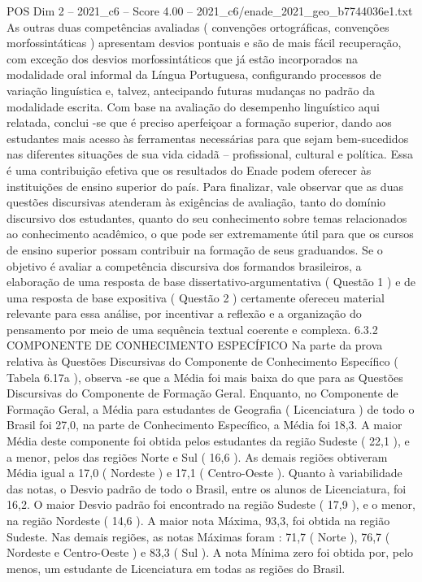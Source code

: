 \begin{textsample}{POS Dim 2 – 2021\_c6 – Score 4.00 – 2021\_c6/enade\_2021\_geo\_b7744036e1.txt}
As outras duas competências avaliadas ( convenções ortográficas, convenções morfossintáticas ) apresentam desvios pontuais e são de mais fácil recuperação, com exceção dos desvios morfossintáticos que já estão incorporados na modalidade oral informal da Língua Portuguesa, configurando processos de variação linguística e, talvez, antecipando futuras mudanças no padrão da modalidade escrita.
Com base na avaliação do desempenho linguístico aqui relatada, conclui -se que é preciso aperfeiçoar a formação superior, dando aos estudantes mais acesso às ferramentas necessárias para que sejam bem-sucedidos nas diferentes situações de sua vida cidadã – profissional, cultural e política.
Essa é uma contribuição efetiva que os resultados do Enade podem oferecer às instituições de ensino superior do país.
Para finalizar, vale observar que as duas questões discursivas atenderam às exigências de avaliação, tanto do domínio discursivo dos estudantes, quanto do seu conhecimento sobre temas relacionados ao conhecimento acadêmico, o que pode ser extremamente útil para que os cursos de ensino superior possam contribuir na formação de seus graduandos.
Se o objetivo é avaliar a competência discursiva dos formandos brasileiros, a elaboração de uma resposta de base dissertativo-argumentativa ( Questão 1 ) e de uma resposta de base expositiva ( Questão 2 ) certamente ofereceu material relevante para essa análise, por incentivar a reflexão e a organização do pensamento por meio de uma sequência textual coerente e complexa. 6.3.2 COMPONENTE DE CONHECIMENTO ESPECÍFICO Na parte da prova relativa às Questões Discursivas do Componente de Conhecimento Específico ( Tabela 6.17a ), observa -se que a Média foi mais baixa do que para as Questões Discursivas do Componente de Formação Geral.
Enquanto, no Componente de Formação Geral, a Média para estudantes de Geografia ( Licenciatura ) de todo o Brasil foi 27,0, na parte de Conhecimento Específico, a Média foi 18,3.
A maior Média deste componente foi obtida pelos estudantes da região Sudeste ( 22,1 ), e a menor, pelos das regiões Norte e Sul ( 16,6 ).
As demais regiões obtiveram Média igual a 17,0 ( Nordeste ) e 17,1 ( Centro-Oeste ).
Quanto à variabilidade das notas, o Desvio padrão de todo o Brasil, entre os alunos de Licenciatura, foi 16,2.
O maior Desvio padrão foi encontrado na região Sudeste ( 17,9 ), e o menor, na região Nordeste ( 14,6 ).
A maior nota Máxima, 93,3, foi obtida na região Sudeste.
Nas demais regiões, as notas Máximas foram : 71,7 ( Norte ), 76,7 ( Nordeste e Centro-Oeste ) e 83,3 ( Sul ).
A nota Mínima zero foi obtida por, pelo menos, um estudante de Licenciatura em todas as regiões do Brasil.

\end{textsample}
